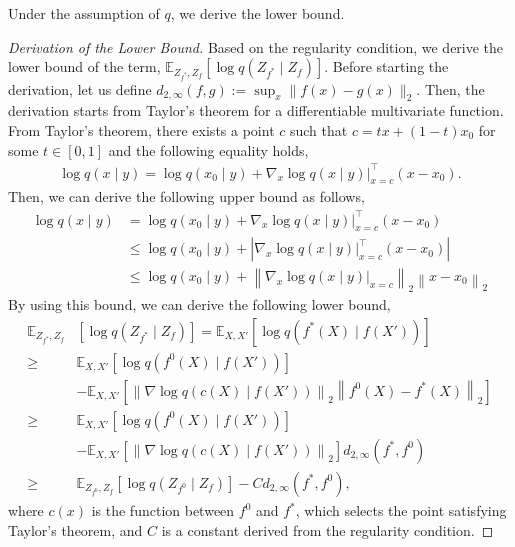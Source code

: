Under the assumption of $q$, we derive the lower bound.
\begin{proof}[Derivation of the Lower Bound]
Based on the regularity condition, we derive the lower bound of the term, $\mathbb{E}_{Z_{f^{*}},Z_{f}}\left[\log q(Z_{f^{*}}\mid Z_{f})\right]$.
Before starting the derivation, let us define $d_{2,\infty}(f,g):=\sup_{x}\|f(x)-g(x)\|_{2}$.
Then, the derivation starts from Taylor's theorem for a differentiable multivariate function.
From Taylor's theorem, there exists a point $c$ such that $c = tx + (1-t)x_{0}$ for some $t\in[0,1]$ and the following equality holds,
\begin{align}
    \log q(x\mid y) = \log q(x_{0}\mid y) + \nabla_{x} \log q(x\mid y)|_{x=c}^{\intercal}(x-x_{0}).
\end{align}
Then, we can derive the following upper bound as follows,
\begin{align}
    \log q(x\mid y) &= \log q(x_{0}\mid y) + \nabla_{x} \log q(x\mid y)|_{x=c}^{\intercal}(x-x_{0})\\
    &\leq \log q(x_{0}\mid y) + \left|\nabla_{x} \log q(x\mid y)|_{x=c}^{\intercal}(x-x_{0})\right|\\
    &\leq \log q(x_{0}\mid y) + \left\|\nabla_{x} \log q(x\mid y)|_{x=c}\right\|_{2}\left\|x-x_{0}\right\|_{2}
\end{align}
By using this bound, we can derive the following lower bound,
\begin{align}
\mathbb{E}_{Z_{f^{*}}, Z_f}&[\log q(Z_{f^{*}}\mid Z_f)]=\mathbb{E}_{X, X'}\left[\log q(f^{*}(X)\mid f(X'))\right]\\
\geq& \mathbb{E}_{X, X'}\left[\log q(f^{0}(X)\mid f(X'))\right] \nonumber\\
&- \mathbb{E}_{X, X'}\left[\left\|\nabla \log q(c(X)\mid f(X'))\right\|_{2}\left\|f^{0}(X)-f^{*}(X)\right\|_{2}\right]\\
\geq& \mathbb{E}_{X, X'}\left[\log q(f^{0}(X)\mid f(X'))\right] \nonumber\\
&- \mathbb{E}_{X, X'}\left[\left\|\nabla \log q(c(X)\mid f(X'))\right\|_{2}\right]d_{2,\infty}(f^{*},f^{0})\\
\geq& \mathbb{E}_{Z_{f^{0}}, Z_f}\left[\log q(Z_{f^{0}}\mid Z_f)\right]- Cd_{2,\infty}(f^{*},f^{0}),
\end{align}
where $c(x)$ is the function between $f^{0}$ and $f^{*}$, which selects the point satisfying Taylor's theorem, and $C$ is a constant derived from the regularity condition.
\end{proof}


